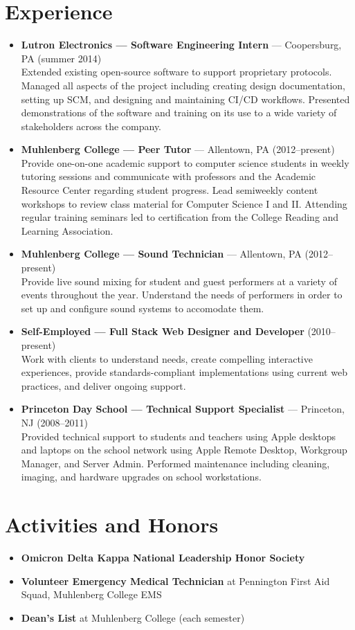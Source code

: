 \documentclass[11pt]{article}
\begin{document}
\section*{Experience}
\begin{itemize}
  \item \textbf{Lutron Electronics --- Software Engineering Intern} --- Coopersburg, PA (summer 2014) \\
    Extended existing open-source software to support proprietary protocols. Managed all aspects of the project including creating design documentation, setting up SCM, and designing and maintaining CI/CD workflows. Presented demonstrations of the software and training on its use to a wide variety of stakeholders across the company.
  \item \textbf{Muhlenberg College --- Peer Tutor} --- Allentown, PA (2012--present) \\
    Provide one-on-one academic support to computer science students in weekly tutoring sessions and communicate with professors and the Academic Resource Center regarding student progress. Lead semiweekly content workshops to review class material for Computer Science I and II. Attending regular training seminars led to certification from the College Reading and Learning Association.
  \item \textbf{Muhlenberg College --- Sound Technician} --- Allentown, PA (2012--present) \\
    Provide live sound mixing for student and guest performers at a variety of events throughout the year. Understand the needs of performers in order to set up and configure sound systems to accomodate them.
  \item \textbf{Self-Employed --- Full Stack Web Designer and Developer} (2010--present) \\
    Work with clients to understand needs, create compelling interactive experiences, provide standards-compliant implementations using current web practices, and deliver ongoing support.
  \item \textbf{Princeton Day School --- Technical Support Specialist} --- Princeton, NJ (2008--2011) \\
    Provided technical support to students and teachers using Apple desktops and laptops on the school network using Apple Remote Desktop, Workgroup Manager, and Server Admin. Performed maintenance including cleaning, imaging, and hardware upgrades on school workstations.
\end{itemize}

\section*{Activities and Honors}
\begin{itemize}
  \item \textbf{Omicron Delta Kappa National Leadership Honor Society}
  \item \textbf{Volunteer Emergency Medical Technician} at Pennington First Aid Squad, Muhlenberg College EMS
  \item \textbf{Dean's List} at Muhlenberg College (each semester)
\end{itemize}
\end{document}
